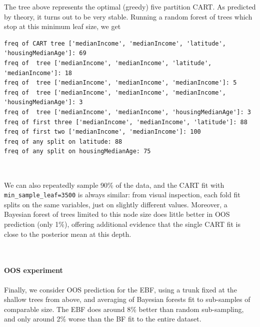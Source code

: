 \documentclass[12pt]{article}
\begin{document}
The tree above represents the optimal (greedy) five partition CART. As
predicted by theory, it turns out to be very stable. Running a random
forest of trees which stop at this minimum leaf size, we get


    \begin{verbatim}
freq of CART tree ['medianIncome', 'medianIncome', 'latitude', 'housingMedianAge']: 69
freq of  tree ['medianIncome', 'medianIncome', 'latitude', 'medianIncome']: 18
freq of  tree ['medianIncome', 'medianIncome', 'medianIncome']: 5
freq of  tree ['medianIncome', 'medianIncome', 'medianIncome', 'housingMedianAge']: 3
freq of  tree ['medianIncome', 'medianIncome', 'housingMedianAge']: 3
freq of first three ['medianIncome', 'medianIncome', 'latitude']: 88
freq of first two ['medianIncome', 'medianIncome']: 100
freq of any split on latitude: 88
freq of any split on housingMedianAge: 75
    \end{verbatim}
        
    \begin{center}
    \end{center}
    { \hspace*{\fill} \\}
    
    We can also repeatedly sample 90\% of the data, and the CART fit with
\texttt{min\_sample\_leaf=3500} is always similar: from visual
inspection, each fold fit splits on the same variables, just on slightly
different values. Moreover, a Bayesian forest of trees limited to this
node size does little better in OOS prediction (only 1\%), offering
additional evidence that the single CART fit is close to the posterior
mean at this depth.
        
    \begin{center}
    \end{center}
    { \hspace*{\fill} \\}
    
    \paragraph{OOS experiment}\label{oos-experiment}

Finally, we consider OOS prediction for the EBF, using a trunk fixed at
the shallow trees from above, and averaging of Bayesian forests fit to
sub-samples of comparable size. The EBF does around 8\% better than
random sub-sampling, and only around 2\% worse than the BF fit to the
entire dataset.
\end{document}
